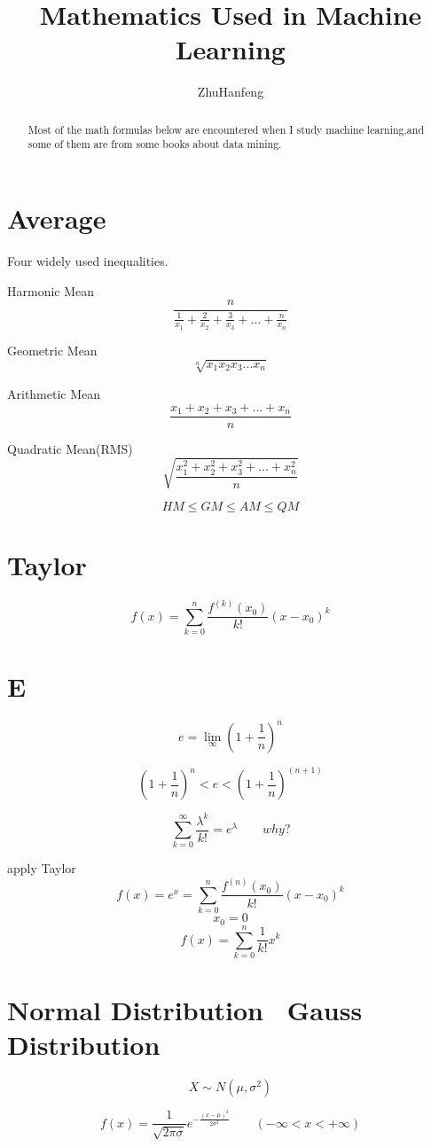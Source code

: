 \documentclass[twocolumn]{article}
\title{Mathematics Used in Machine Learning}
\author{ZhuHanfeng}
\begin{document}
\maketitle

\begin{abstract}
Most of the math formulas below are encountered when I study machine learning,and some of them are from some books about data mining.

\end{abstract}

\section{Average}
Four widely used inequalities.

Harmonic Mean
\[\frac{n}{\frac{1}{x_1} + \frac{2}{x_2} + \frac{3}{x_3} + ... + \frac{n}{x_n}}\]

Geometric Mean
\[\sqrt[n]{x_1x_2x_3...x_n}\]

Arithmetic Mean
\[\frac{x_1 + x_2 + x_3 + ... + x_n}{n}\]

Quadratic Mean(RMS)
\[\sqrt{\frac{x_1^2 + x_2^2 + x_3^2 + ... + x_n^2}{n}}\]

\[HM \leq GM \leq AM \leq QM\]
\section{Taylor}
\[f(x) = \sum_{k=0}^n\frac{f^{(k)}(x_0)}{k!}(x-x_0)^k\]

\section{E}

\[e = \lim\limits_{\infty}(1+\frac{1}{n})^n\]

\[(1+\frac{1}{n})^n < e < (1+\frac{1}{n})^{(n+1)}\]

\[\sum\limits_{k=0}^{\infty}\frac{\lambda^k}{k!} = e^\lambda\qquad why?\]

apply Taylor
\[f(x) = e^x = \sum_{k=0}^n\frac{f^{(n)}(x_0)}{k!}{(x-x_0)^k} \]
\[x_0 = 0\]
\[f(x) = \sum_{k=0}^n\frac{1}{k!}x^k\]



\section{Normal Distribution \ Gauss Distribution}
\[X \sim N(\mu, \sigma^2)\]

\[f(x)=\frac{1}{\sqrt{2\pi\sigma}}e^{-\frac{(x-\mu)^2}{2\sigma^2}}\qquad(-\infty < x < +\infty)\]
\end{document}
